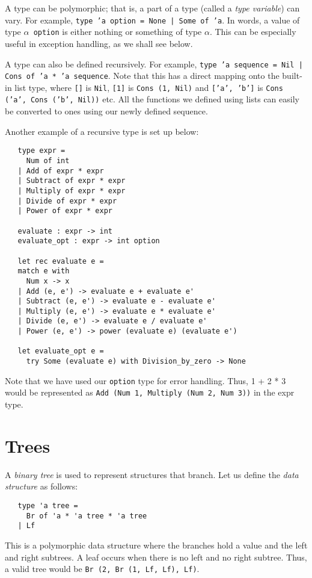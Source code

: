 \documentclass[12pt]{article}
\begin{document}
 A type can be polymorphic; that is, a part of a type (called a \textit{type variable}) can vary. For example,
 \texttt{type 'a option = None | Some of 'a}. In words, a value of type \texttt{$\alpha$ option} is either nothing or something
 of type $\alpha$. This can be especially useful in exception handling, as we shall see below.

 A type can also be defined recursively. For example, \texttt{type 'a sequence = Nil | Cons of 'a * 'a sequence}.
 Note that this has a direct mapping onto the built-in list type, where \texttt{[]} is \texttt{Nil}, \texttt{[1]} is \texttt{Cons (1, Nil)} and \texttt{['a', 'b']} is \texttt{Cons ('a', Cons ('b', Nil))}
 etc. All the functions we defined using lists can easily be converted to ones using our newly defined sequence.

 Another example of a recursive type is set up below:
 \begin{lstlisting}
   type expr =
     Num of int
   | Add of expr * expr
   | Subtract of expr * expr
   | Multiply of expr * expr
   | Divide of expr * expr
   | Power of expr * expr

   evaluate : expr -> int
   evaluate_opt : expr -> int option

   let rec evaluate e =
   match e with
     Num x -> x
   | Add (e, e') -> evaluate e + evaluate e'
   | Subtract (e, e') -> evaluate e - evaluate e'
   | Multiply (e, e') -> evaluate e * evaluate e'
   | Divide (e, e') -> evaluate e / evaluate e'
   | Power (e, e') -> power (evaluate e) (evaluate e')

   let evaluate_opt e =
     try Some (evaluate e) with Division_by_zero -> None
 \end{lstlisting}
 Note that we have used our \texttt{option} type for error handling. Thus, 1 + 2 * 3 would be represented as
 \texttt{Add (Num 1, Multiply (Num 2, Num 3))} in the expr type.

 \section{Trees}
 A \textit{binary tree} is used to represent structures that branch. Let us define the \textit{data structure} as
 follows:
 \begin{lstlisting}
   type 'a tree =
     Br of 'a * 'a tree * 'a tree
   | Lf
 \end{lstlisting}
This is a polymorphic data structure where the branches hold a value and the left and right subtrees. A leaf occurs when there is no left and
no right subtree. Thus, a valid tree would be \texttt{Br (2, Br (1, Lf, Lf), Lf)}.
\end{document}
